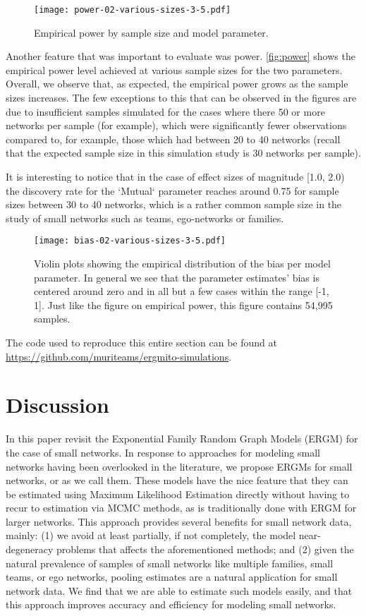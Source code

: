 \documentclass[12pt]{article}
\begin{document}
\begin{figure}
	\centering
	\caption{\label{fig:power}Empirical power by sample size and model parameter.}
	\texttt{[image: power-02-various-sizes-3-5.pdf]}
\end{figure}

Another feature that was important to evaluate was power. \autoref{fig:power} shows the empirical power level achieved at various sample sizes for the two parameters. Overall, we observe that, as expected, the empirical power grows as the sample sizes increases. The few exceptions to this that can be observed in the figures are due to insufficient samples simulated for the cases where there 50 or more networks per sample (for example), which were significantly fewer observations compared to, for example, those which had between 20 to 40 networks (recall that the expected sample size in this simulation study is 30 networks per sample).

It is interesting to notice that in the case of effect sizes of magnitude [1.0, 2.0) the discovery rate for the `Mutual` parameter reaches around 0.75 for sample sizes between 30 to 40 networks, which is a rather common sample size in the study of small networks such as teams, ego-networks or families.

\begin{figure}
    \centering
    \caption{\label{fig:bias}Violin plots showing the empirical distribution of the bias per model parameter. In general we see that the parameter estimates' bias is centered around zero and in all but a few cases within the range [-1, 1]. Just like the figure on empirical power, this figure contains 54,995 samples.}
    \texttt{[image: bias-02-various-sizes-3-5.pdf]}
\end{figure}

The code used to reproduce this entire section can be found at \url{https://github.com/muriteams/ergmito-simulations}.

\pagebreak
\section{Discussion}

In this paper revisit the Exponential Family Random Graph Models (ERGM) for the case of small networks. In response to approaches for modeling small networks having been overlooked in the literature, we propose ERGMs for small networks, or \ergmitos{} as we call them. These models have the nice feature that they can be estimated using Maximum Likelihood Estimation directly without having to recur to estimation via MCMC methods, as is traditionally done with ERGM for larger networks. This approach provides several benefits for small network data, mainly: (1) we avoid at least partially, if not completely, the model near-degeneracy problems that affects the aforementioned methods; and (2) given the natural prevalence of samples of small networks like multiple families, small teams, or ego networks, pooling estimates are a natural application for small network data. We find that  we are able to estimate such models easily, and that this approach improves accuracy and efficiency for modeling small networks.
\end{document}

